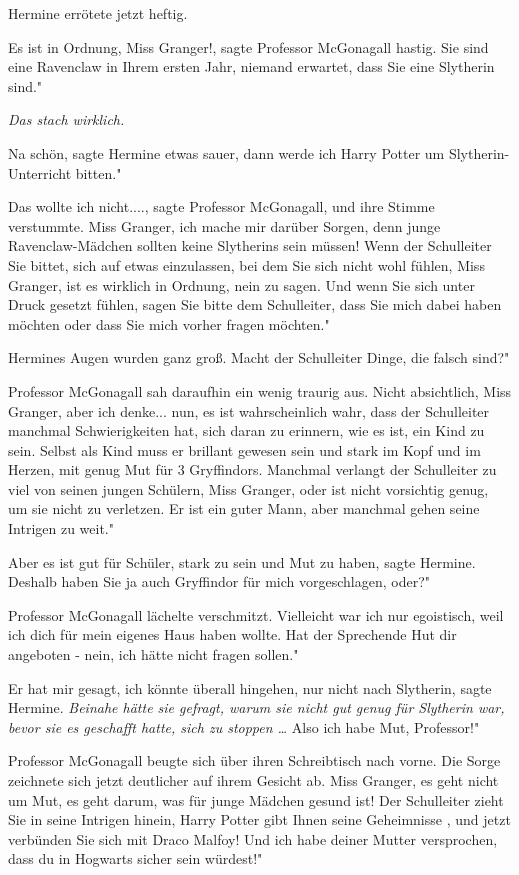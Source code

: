 Hermine errötete jetzt heftig.

\glqq Es ist in Ordnung, Miss Granger!\grqq{}, sagte Professor McGonagall
hastig. \glqq Sie sind eine Ravenclaw in Ihrem ersten Jahr, niemand erwartet,
dass Sie eine Slytherin sind."

\emph{ Das stach wirklich.}

\glqq Na schön\grqq{}, sagte Hermine etwas sauer, \glqq dann werde ich Harry
Potter um Slytherin-Unterricht bitten."

\glqq Das wollte ich nicht....\grqq{}, sagte Professor McGonagall, und ihre
Stimme verstummte. \glqq Miss Granger, ich mache mir darüber Sorgen, denn junge
Ravenclaw-Mädchen sollten keine Slytherins sein müssen! Wenn der Schulleiter Sie
bittet, sich auf etwas einzulassen, bei dem Sie sich nicht wohl fühlen, Miss
Granger, ist es wirklich in Ordnung, nein zu sagen. Und wenn Sie sich unter
Druck gesetzt fühlen, sagen Sie bitte dem Schulleiter, dass Sie mich dabei haben
möchten oder dass Sie mich vorher fragen möchten."

Hermines Augen wurden ganz groß. \glqq Macht der Schulleiter Dinge, die falsch
sind?"

Professor McGonagall sah daraufhin ein wenig traurig aus. \glqq Nicht
absichtlich, Miss Granger, aber ich denke... nun, es ist wahrscheinlich wahr,
dass der Schulleiter manchmal Schwierigkeiten hat, sich daran zu erinnern, wie
es ist, ein Kind zu sein. Selbst als Kind muss er brillant gewesen sein und
stark im Kopf und im Herzen, mit genug Mut für 3 Gryffindors. Manchmal verlangt
der Schulleiter zu viel von seinen jungen Schülern, Miss Granger, oder ist nicht
vorsichtig genug, um sie nicht zu verletzen. Er ist ein guter Mann, aber
manchmal gehen seine Intrigen zu weit."

\glqq Aber es ist gut für Schüler, stark zu sein und Mut zu haben\grqq{}, sagte
Hermine. \glqq Deshalb haben Sie ja auch Gryffindor für mich vorgeschlagen,
oder?"

Professor McGonagall lächelte verschmitzt. \glqq Vielleicht war ich nur
egoistisch, weil ich dich für mein eigenes Haus haben wollte. Hat der Sprechende
Hut dir angeboten - nein, ich hätte nicht fragen sollen."

\glqq Er hat mir gesagt, ich könnte überall hingehen, nur nicht nach
Slytherin\grqq{}, sagte Hermine.
\emph{Beinahe hätte sie gefragt, warum sie nicht gut genug für Slytherin war, bevor sie es geschafft hatte, sich zu stoppen …}
\glqq Also ich habe Mut, Professor!"

Professor McGonagall beugte sich über ihren Schreibtisch nach vorne. Die Sorge
zeichnete sich jetzt deutlicher auf ihrem Gesicht ab. \glqq Miss Granger, es
geht nicht um Mut, es geht darum, was für junge Mädchen gesund ist! Der
Schulleiter zieht Sie in seine Intrigen hinein, Harry Potter gibt Ihnen seine
Geheimnisse , und jetzt verbünden Sie sich mit Draco Malfoy! Und ich habe deiner
Mutter versprochen, dass du in Hogwarts sicher sein würdest!"

